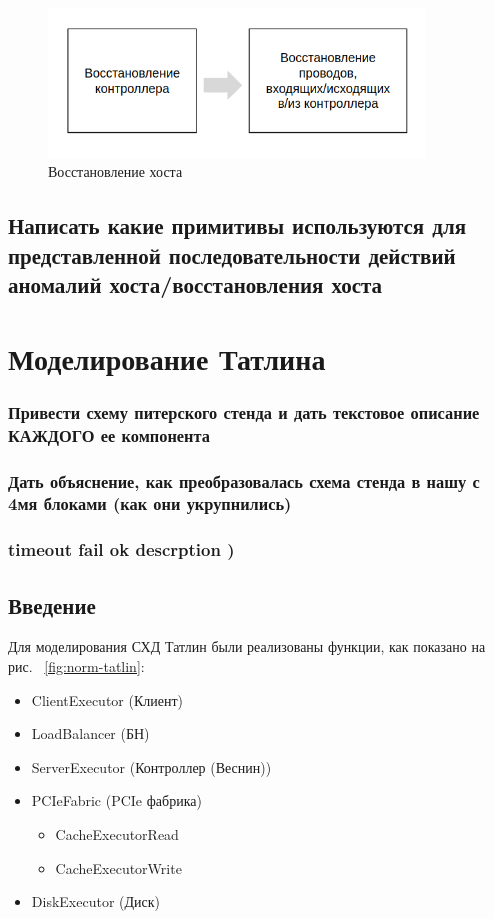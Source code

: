 \begin{figure}[!ht]
\centering
\includegraphics[width=10cm]{Kenenbek/images/repair-host.png}
\caption{Восстановление хоста}
\label{fig:repai-host}
\end{figure}

\subsection{Написать какие примитивы используются для представленной последовательности действий аномалий хоста/восстановления хоста}


\section{Моделирование Татлина}\label{Tatlin}
\subsubsection{Привести схему питерского стенда и дать текстовое описание КАЖДОГО ее компонента}

\subsubsection{Дать объяснение, как преобразовалась схема стенда в нашу с 4мя блоками (как они укрупнились)}


\subsubsection{timeout fail ok descrption )}

\subsection{Введение}

Для моделирования СХД Татлин были реализованы функции, как показано на рис.  ~\ref{fig:norm-tatlin}:

\begin{itemize}
\item ClientExecutor (Клиент) 
\item LoadBalancer (БН)
\item ServerExecutor (Контроллер (Веснин))
\item PCIeFabric (PCIe фабрика)
\begin{itemize}
\item CacheExecutorRead
\item CacheExecutorWrite
\end{itemize}
\item DiskExecutor (Диск)
\end{itemize}




